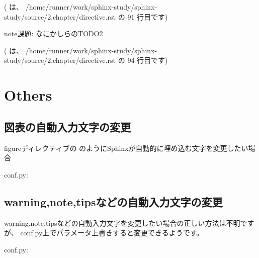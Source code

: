 \documentclass[letterpaper,10pt,dvipdfmx,openany,oneside]{sphinxmanual}
\begin{document}
({\hyperref[\detokenize{2.chapter/directive:index-0}]{}} は、 /home/runner/work/sphinx-study/sphinx-study/source/2.chapter/directive.rst の 91 行目です)

\begin{sphinxadmonition}{note}{課題:}
なにかしらのTODO2
\end{sphinxadmonition}

({\hyperref[\detokenize{2.chapter/directive:index-1}]{}} は、 /home/runner/work/sphinx-study/sphinx-study/source/2.chapter/directive.rst の 94 行目です)


\chapter{Others}
\label{\detokenize{3.chapter/others::doc}}\label{\detokenize{3.chapter/others:others}}

\section{図表の自動入力文字の変更}
\label{\detokenize{3.chapter/others:id1}}
figureディレクティブの  のようにSphinxが自動的に埋め込む文字を変更したい場合

conf.py:

%
\begin{sphinxVerbatim}[commandchars=\\\{\}]
     
\end{sphinxVerbatim}


\section{warning,note,tipsなどの自動入力文字の変更}
\label{\detokenize{3.chapter/others:warning-note-tips}}
warning,note,tipsなどの自動入力文字を変更したい場合の正しい方法は不明ですが、
conf.py上でパラメータ上書きすると変更できるようです。

conf.py:

%
\begin{sphinxVerbatim}[commandchars=\\\{\}]
   

\PYG{p}{[}\PYG{p}{]}  
\PYG{p}{[}\PYG{p}{]}  
\end{sphinxVerbatim}
\end{document}
